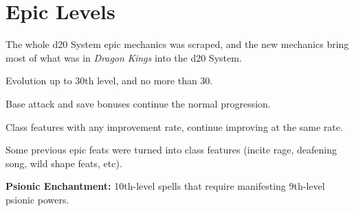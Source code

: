 \section{Epic Levels}
The whole d20 System epic mechanics was scraped, and the new mechanics bring most of what was in \emph{Dragon Kings} into the d20 System.

\begin{itemize*}
\item Evolution up to 30th level, and no more than 30.
\item Base attack and save bonuses continue the normal progression.
\item Class features with any improvement rate, continue improving at the same rate.
\item Some previous epic feats were turned into class features (incite rage, deafening song, wild shape feats, etc).
\item \textbf{Psionic Enchantment:} 10th-level spells that require manifesting 9th-level psionic powers.
\end{itemize*}